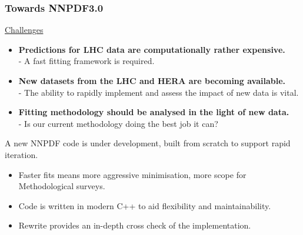 \documentclass[10pt]{beamer}
\begin{document}
\begin{frame}

\frametitle{Towards NNPDF3.0}

\underline{Challenges}
\begin{itemize}
\item<1-> \textbf{Predictions for LHC data are computationally rather expensive.}\\
		- A fast fitting framework is required.
\item<1-> \textbf{New datasets from the LHC and HERA are becoming available.} \\
		- The ability to rapidly implement and assess the impact of new data is vital.
\item<1-> \textbf {Fitting methodology should be analysed in the light of new data.} \\
		- Is our current methodology doing the best job it can?

\end{itemize}

\vskip20pt

\small A new NNPDF code is under development, built from scratch to support rapid iteration.
\begin{itemize}
\item<1-> Faster fits means more aggressive minimisation, more scope for Methodological surveys.
\item<1-> Code is written in modern C++ to aid flexibility and maintainability.
\item<1-> Rewrite provides an in-depth cross check of the implementation.
\end{itemize}

\end{frame}
\end{document}
